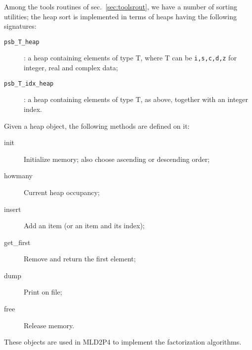 Among the tools routines of sec.~\ref{sec:toolsrout}, we have a number
of sorting utilities; the heap sort is implemented in terms of heaps
having the following signatures:
\begin{description}
\item[\tt psb\_T\_heap]: a heap containing elements of type T, where T
  can be \verb|i,s,c,d,z| for integer, real and complex data;
\item[\tt psb\_T\_idx\_heap]: a heap containing elements of type T, as
  above, together with an integer index.
\end{description}
Given a heap object, the following methods are defined on it:
\begin{description}
\item[init] Initialize memory; also choose ascending or descending
  order;
\item[howmany] Current heap occupancy;
\item[insert] Add an item (or an item and its index);
\item[get\_first] Remove and return the first element;
\item[dump] Print on file;
\item[free] Release memory.
\end{description}
These objects are used in MLD2P4 to implement the factorization
algorithms. 

